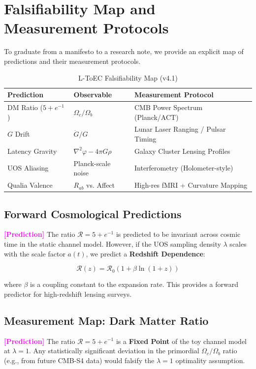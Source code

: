 \documentclass[11pt,titlepage]{article}
\newcommand{\tagpred}{\textcolor{magenta}{\textbf{[Prediction]}} }
\begin{document}
\section{Falsifiability Map and Measurement Protocols}
\label{sec:falsifiability}
To graduate from a manifesto to a research note, we provide an explicit map of predictions and their measurement protocols.

\begin{table}[h!]
\centering
\begin{tabular}{@{}lll@{}}
\toprule
\textbf{Prediction} & \textbf{Observable} & \textbf{Measurement Protocol} \\ \midrule
DM Ratio ($5+e^{-1}$) & $\Omega_c / \Omega_b$ & CMB Power Spectrum (Planck/ACT) \\
$G$ Drift & $\dot{G}/G$ & Lunar Laser Ranging / Pulsar Timing \\
Latency Gravity & $\nabla^2 \varphi - 4\pi G \rho$ & Galaxy Cluster Lensing Profiles \\
UOS Aliasing & Planck-scale noise & Interferometry (Holometer-style) \\
Qualia Valence & $R_{ab}$ vs. Affect & High-res fMRI + Curvature Mapping \\ \bottomrule
\end{tabular}
\caption{L-ToEC Falsifiability Map (v4.1)}
\end{table}


\subsection{Forward Cosmological Predictions}
\tagpred The ratio $\mathcal{R} = 5 + e^{-1}$ is predicted to be invariant across cosmic time in the static channel model. However, if the UOS sampling density $\lambda$ scales with the scale factor $a(t)$, we predict a \textbf{Redshift Dependence}:

\begin{equation}
\mathcal{R}(z) = \mathcal{R}_0 (1 + \beta \ln(1+z))
\end{equation}

where $\beta$ is a coupling constant to the expansion rate. This provides a forward predictor for high-redshift lensing surveys.

\subsection{Measurement Map: Dark Matter Ratio}
\tagpred The ratio $\mathcal{R} = 5 + e^{-1}$ is a \textbf{Fixed Point} of the toy channel model at $\lambda=1$. Any statistically significant deviation in the primordial $\Omega_c/\Omega_b$ ratio (e.g., from future CMB-S4 data) would falsify the $\lambda=1$ optimality assumption.
\end{document}
